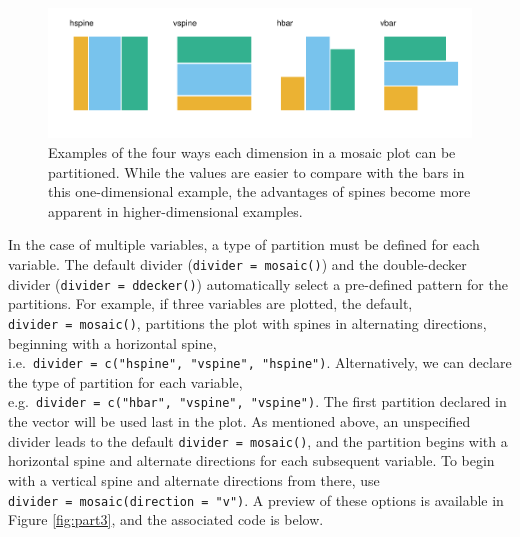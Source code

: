 \begin{figure}[h]

{\centering \includegraphics[width=1\linewidth]{jeppson-hofmann_files/figure-latex/part1-1} 

}

\caption{Examples of the four ways each dimension in a mosaic plot can be partitioned. While the values are easier to compare with the bars in this one-dimensional example, the advantages of spines become more apparent in higher-dimensional examples.}\label{fig:part1}
\end{figure}

In the case of multiple variables, a type of partition must be defined for each variable. The default divider (\texttt{divider\ =\ mosaic()}) and the double-decker divider (\texttt{divider\ =\ ddecker()}) automatically select a pre-defined pattern for the partitions. For example, if three variables are plotted, the default, \texttt{divider\ =\ mosaic()}, partitions the plot with spines in alternating directions, beginning with a horizontal spine, i.e.~\texttt{divider\ =\ c("hspine",\ "vspine",\ "hspine")}. Alternatively, we can declare the type of partition for each variable, e.g.~\texttt{divider\ =\ c("hbar",\ "vspine",\ "vspine")}. The first partition declared in the vector will be used last in the plot. As mentioned above, an unspecified divider leads to the default \texttt{divider\ =\ mosaic()}, and the partition begins with a horizontal spine and alternate directions for each subsequent variable. To begin with a vertical spine and alternate directions from there, use \texttt{divider\ =\ mosaic(direction\ =\ "v")}. A preview of these options is available in Figure \ref{fig:part3}, and the associated code is below.

